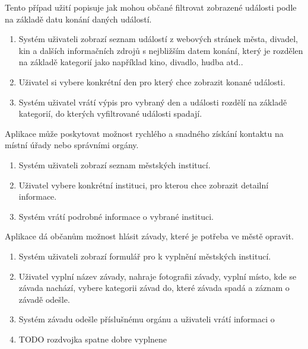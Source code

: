 Tento případ užití popisuje jak mohou občané filtrovat zobrazené události podle na základě datu konání daných událostí.

\begin{enumerate}
  \item Systém uživateli zobrazí seznam událostí z webových stránek města, divadel, kin a dalších informačních zdrojů s nejbližším datem konání, který 
  je rozdělen na základě kategorií jako například kino, divadlo, hudba atd..
  \item Uživatel si vybere konkrétní den pro který chce zobrazit konané události.
  \item Systém uživatel vrátí výpis pro vybraný den a události rozdělí na základě kategorií, do kterých vyfiltrované události spadají.
\end{enumerate}

Aplikace může poskytovat možnost rychlého a snadného získání kontaktu na místní úřady nebo správními orgány. %

\begin{enumerate}
  \item Systém uživateli zobrazí seznam městských institucí.
  \item Uživatel vybere konkrétní instituci, pro kterou chce zobrazit detailní informace.
  \item Systém vrátí podrobné informace o vybrané instituci.  
\end{enumerate}

Aplikace dá občanům možnost hlásit závady, které je potřeba ve městě opravit.

\begin{enumerate}
  \item Systém uživateli zobrazí formulář pro k vyplnění městských institucí.
  \item Uživatel vyplní název závady, nahraje fotografii závady, vyplní místo, kde se závada nachází, vybere kategorii závad do, které závada spadá a 
  záznam o závadě odešle.
  \item Systém závadu odešle příslušnému orgánu a uživateli vrátí informaci o 
  
  \item TODO rozdvojka spatne dobre vyplnene
\end{enumerate}

